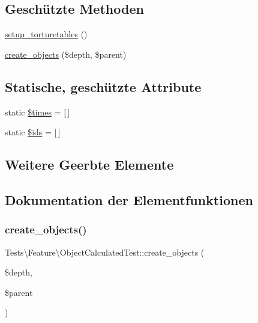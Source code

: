 \subsection*{Geschützte Methoden}
\begin{DoxyCompactItemize}
\item 
\hyperlink{classTests_1_1Feature_1_1ObjectCalculatedTest_a16c11746f49e1aea4e0e3e5e5a803a54}{setup\+\_\+torturetables} ()
\item 
\hyperlink{classTests_1_1Feature_1_1ObjectCalculatedTest_a07e1a8d0a074e667111367290315a669}{create\+\_\+objects} (\$depth, \$parent)
\end{DoxyCompactItemize}
\subsection*{Statische, geschützte Attribute}
\begin{DoxyCompactItemize}
\item 
static \hyperlink{classTests_1_1Feature_1_1ObjectCalculatedTest_a4f30aaf64058413305e5b585de20cec8}{\$times} = \mbox{[}$\,$\mbox{]}
\item 
static \hyperlink{classTests_1_1Feature_1_1ObjectCalculatedTest_a9ce577c219f39520c539cf6d53d675c8}{\$ids} = \mbox{[}$\,$\mbox{]}
\end{DoxyCompactItemize}
\subsection*{Weitere Geerbte Elemente}


\subsection{Dokumentation der Elementfunktionen}
\mbox{\label{classTests_1_1Feature_1_1ObjectCalculatedTest_a07e1a8d0a074e667111367290315a669}} 
\subsubsection{\texorpdfstring{create\+\_\+objects()}{create\_objects()}}
{\footnotesize\ttfamily Tests\textbackslash{}\+Feature\textbackslash{}\+Object\+Calculated\+Test\+::create\+\_\+objects (\begin{DoxyParamCaption}\item[{}]{\$depth,  }\item[{}]{\$parent }\end{DoxyParamCaption})\hspace{0.3cm}{\ttfamily [protected]}}

